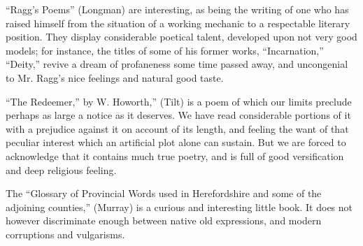 ``Ragg's Poems'' (Longman) are interesting, as being
the writing of one who has raised himself from the situation of a
working mechanic to a respectable literary position. They display
considerable poetical talent, developed upon not very good models; for
instance, the titles of some of his former works, ``Incarnation,'' ``Deity,''
revive a dream of profaneness some time passed away, and uncongenial to
Mr. Ragg's nice feelings and natural good taste.

``The Redeemer,'' by W. Howorth,'' (Tilt) is a poem of
which our limits preclude perhaps as large a notice as it deserves. We
have read considerable portions of it with a prejudice against it on
account of its length, and feeling the want of that peculiar interest
which an artificial plot alone can sustain. But we are forced to
acknowledge that it contains much true poetry, and is full of good
versification and deep religious feeling.

The ``Glossary of Provincial Words used in
Herefordshire and some of the adjoining counties,'' (Murray) is a curious
and interesting little book. It does not however discriminate enough
between native old expressions, and modern corruptions and vulgarisms.

